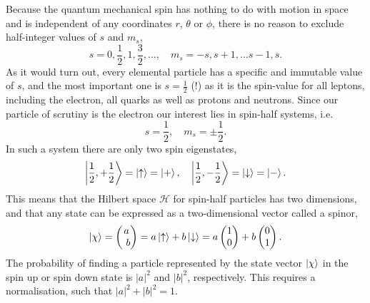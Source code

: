    Because the quantum mechanical spin has nothing to do with motion in space and 
    is independent of any coordinates $r$, $\theta$ or $\phi$, there is no reason to 
    exclude half-integer values of $s$ and $m_s$,
    \begin{equation}
        s=0,\frac{1}{2},1,\frac{3}{2},\dots, \quad m_s = -s, s + 1, \dots s - 1, s.
    \end{equation}
    As it would turn out, every elemental particle has a specific and immutable value of 
    $s$, and the most important one is $s=\frac{1}{2}$ (!) as it is the spin-value for 
    all leptons, including the electron, all quarks as well as protons and neutrons. Since 
    our particle of scrutiny is the electron our interest lies in spin-half systems, i.e. 
    \begin{equation}
        s = \frac{1}{2}, \quad m_s = \pm \frac{1}{2}.
    \end{equation}
    In such a system there are only two spin eigenstates,
    \begin{equation}
        \ket{\frac{1}{2},+\frac{1}{2}} = \ket{\uparrow} = \ket{+}, \quad
        \ket{\frac{1}{2},-\frac{1}{2}} = \ket{\downarrow} = \ket{-}.
    \end{equation}
    This means that the Hilbert space $\mathcal{H}$ for spin-half particles has 
    two dimensions, and that any state can be expressed as a two-dimensional 
    vector called a spinor,
    \begin{equation}
        \ket{\chi} = \begin{pmatrix}
            a \\ b
        \end{pmatrix}
        = a\ket{\uparrow} + b\ket{\downarrow}
        = a\begin{pmatrix}
            1 \\ 0 
        \end{pmatrix}
        + b\begin{pmatrix}
            0 \\ 1
        \end{pmatrix}.
    \end{equation}
    The probability of finding a particle represented by the state vector $\ket{\chi}$
    in the spin up or spin down state is $|a|^2$ and $|b|^2$, respectively. This requires 
    a normalisation, such that $|a|^2 + |b|^2 = 1$.


